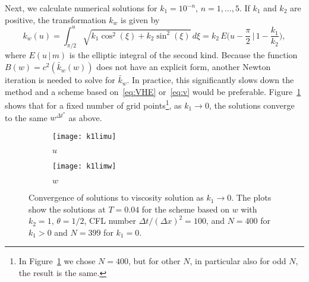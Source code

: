 \documentclass[11pt,leqno]{amsart}
\begin{document}
Next, we calculate numerical solutions for $k_1=10^{-n}$, $n=1,\dots,5$. If $k_1$ and $k_2$ are positive, the transformation $k_w$ is given by 
\begin{equation*}
  k_w(u)=\int_{\pi/2}^u \sqrt{k_1 \cos^2(\xi)+k_2 \sin^2(\xi)} \,d\xi= k_2\, E\Big(u-\frac{\pi}{2} \,\Big|
\, 1- \frac{k_1}{k_2} \Big),
\end{equation*}
where $E(u\,|\,m)$ is the elliptic integral of the second kind. Because the function $B(w)=c^2(\bar{k}_w(w))$ does not have an explicit form, another Newton iteration is needed to solve for $\bar{k}_w$. 
In practice, this significantly slows down the method  and a scheme based on~\eqref{eq:VHE} or~\eqref{eq:v} would be preferable. Figure~\ref{fig:k1lim} shows that for a fixed number of grid points\footnote{ In Figure~\ref{fig:k1lim} we chose $N=400$, but for other $N$, in particular also for odd $N$, the result is the same.}, as $k_1\rightarrow 0$, the solutions converge to the same $w^{\Delta t^*}$ as above.
\begin{figure}
  \centering
  \begin{subfigure}[b]{.45\textwidth}\centering
  \texttt{[image: k1limu]}
\caption{$u$}    
  \end{subfigure}
  \begin{subfigure}[b]{.45\textwidth}\centering
  \texttt{[image: k1limw]}
\caption{$w$}    
  \end{subfigure}
  \caption{Convergence of solutions to viscosity solution as $k_1\rightarrow 0$. The plots show the solutions at $T=0.04$ for the scheme based on $w$ with $k_2=1$, $\theta=1/2$, CFL number $\Delta t/(\Delta x)^2=100$, and $N=400$ for $k_1>0$ and $N=399$ for $k_1=0$.}\label{fig:k1lim}
\end{figure}
\end{document}
